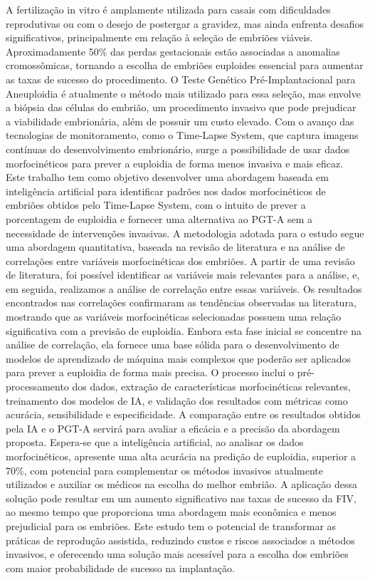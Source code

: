 \begin{resumo}
A fertilização in
 vitro é amplamente utilizada para casais com dificuldades reprodutivas ou com o desejo de postergar a gravidez, mas ainda enfrenta desafios significativos, principalmente em relação à seleção de embriões viáveis. Aproximadamente 50\% das perdas gestacionais estão associadas a anomalias cromossômicas, tornando a escolha de embriões euploides essencial para aumentar as taxas de sucesso do procedimento. O Teste Genético Pré-Implantacional para Aneuploidia é atualmente o método mais utilizado para essa seleção, mas envolve a biópsia das células do embrião, um procedimento invasivo que pode prejudicar a viabilidade embrionária, além de possuir um custo elevado. Com o avanço das tecnologias de monitoramento, como o Time-Lapse System, que captura imagens contínuas do desenvolvimento embrionário, surge a possibilidade de usar dados morfocinéticos para prever a euploidia de forma menos invasiva e mais eficaz. Este trabalho tem como objetivo desenvolver uma abordagem baseada em inteligência artificial para identificar padrões nos dados morfocinéticos de embriões obtidos pelo Time-Lapse System, com o intuito de prever a porcentagem de euploidia e fornecer uma alternativa ao PGT-A sem a necessidade de intervenções invasivas. A metodologia adotada para o estudo segue uma abordagem quantitativa, baseada na revisão de literatura e na análise de correlações entre variáveis morfocinéticas dos embriões. A partir de uma revisão de literatura, foi possível identificar as variáveis mais relevantes para a análise, e, em seguida, realizamos a análise de correlação entre essas variáveis. Os resultados encontrados nas correlações confirmaram as tendências observadas na literatura, mostrando que as variáveis morfocinéticas selecionadas possuem uma relação significativa com a previsão de euploidia. Embora esta fase inicial se concentre na análise de correlação, ela fornece uma base sólida para o desenvolvimento de modelos de aprendizado de máquina mais complexos que poderão ser aplicados para prever a euploidia de forma mais precisa. O processo inclui o pré-processamento dos dados, extração de características morfocinéticas relevantes, treinamento dos modelos de IA, e validação dos resultados com métricas como acurácia, sensibilidade e especificidade. A comparação entre os resultados obtidos pela IA e o PGT-A servirá para avaliar a eficácia e a precisão da abordagem proposta. Espera-se que a inteligência artificial, ao analisar os dados morfocinéticos, apresente uma alta acurácia na predição de euploidia, superior a 70\%, com potencial para complementar os métodos invasivos atualmente utilizados e auxiliar os médicos na escolha do melhor embrião. A aplicação dessa solução pode resultar em um aumento significativo nas taxas de sucesso da FIV, ao mesmo tempo que proporciona uma abordagem mais econômica e menos prejudicial para os embriões. Este estudo tem o potencial de transformar as práticas de reprodução assistida, reduzindo custos e riscos associados a métodos invasivos, e oferecendo uma solução mais acessível para a escolha dos embriões com maior probabilidade de sucesso na implantação.


\end{resumo}
